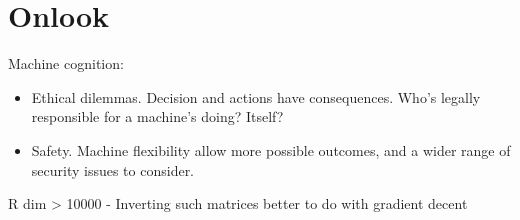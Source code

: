 \section{Onlook}

Machine cognition:
\begin{itemize}
\item Ethical dilemmas. Decision and actions have consequences. Who's legally responsible for a machine's doing? Itself?
\item Safety. Machine flexibility allow more possible outcomes, and a wider range of security issues to consider.
\end{itemize}

R dim > 10000
- Inverting such matrices better to do with gradient decent

